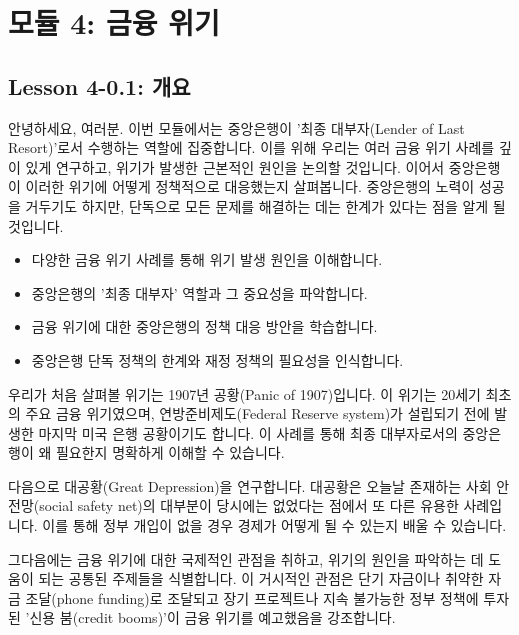 \documentclass[11pt,a4paper]{article}
\theoremstyle{definition}
\begin{document}
\newpage

\section{모듈 4: 금융 위기}

\subsection{Lesson 4-0.1: 개요}
안녕하세요, 여러분. 이번 모듈에서는 중앙은행이 '최종 대부자(Lender of Last Resort)'로서 수행하는 역할에 집중합니다. 이를 위해 우리는 여러 금융 위기 사례를 깊이 있게 연구하고, 위기가 발생한 근본적인 원인을 논의할 것입니다. 이어서 중앙은행이 이러한 위기에 어떻게 정책적으로 대응했는지 살펴봅니다. 중앙은행의 노력이 성공을 거두기도 하지만, 단독으로 모든 문제를 해결하는 데는 한계가 있다는 점을 알게 될 것입니다.

\begin{tcolorbox}[title=\textbf{모듈 4 학습 목표}]
\begin{itemize}
    \item 다양한 금융 위기 사례를 통해 위기 발생 원인을 이해합니다.
    \item 중앙은행의 '최종 대부자' 역할과 그 중요성을 파악합니다.
    \item 금융 위기에 대한 중앙은행의 정책 대응 방안을 학습합니다.
    \item 중앙은행 단독 정책의 한계와 재정 정책의 필요성을 인식합니다.
\end{itemize}
\end{tcolorbox}

우리가 처음 살펴볼 위기는 1907년 공황(Panic of 1907)입니다. 이 위기는 20세기 최초의 주요 금융 위기였으며, 연방준비제도(Federal Reserve system)가 설립되기 전에 발생한 마지막 미국 은행 공황이기도 합니다. 이 사례를 통해 최종 대부자로서의 중앙은행이 왜 필요한지 명확하게 이해할 수 있습니다.

다음으로 대공황(Great Depression)을 연구합니다. 대공황은 오늘날 존재하는 사회 안전망(social safety net)의 대부분이 당시에는 없었다는 점에서 또 다른 유용한 사례입니다. 이를 통해 정부 개입이 없을 경우 경제가 어떻게 될 수 있는지 배울 수 있습니다.

그다음에는 금융 위기에 대한 국제적인 관점을 취하고, 위기의 원인을 파악하는 데 도움이 되는 공통된 주제들을 식별합니다. 이 거시적인 관점은 단기 자금이나 취약한 자금 조달(phone funding)로 조달되고 장기 프로젝트나 지속 불가능한 정부 정책에 투자된 '신용 붐(credit booms)'이 금융 위기를 예고했음을 강조합니다.
\end{document}
